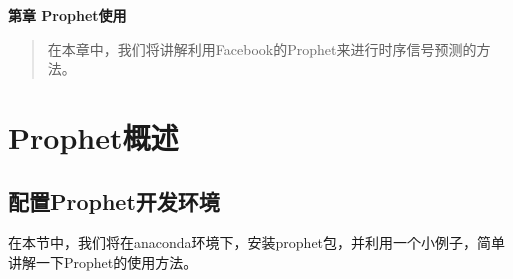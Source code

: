 \newpage
\maketitle
\begin{center}
\Large \textbf{第章 Prophet使用} \quad 
\end{center}
\begin{abstract}
在本章中，我们将讲解利用Facebook的Prophet来进行时序信号预测的方法。
\end{abstract}
\section{Prophet概述}
\subsection{配置Prophet开发环境}
在本节中，我们将在anaconda环境下，安装prophet包，并利用一个小例子，简单讲解一下Prophet的使用方法。


